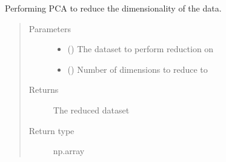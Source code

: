 \documentclass[letterpaper,10pt,english]{sphinxmanual}
\begin{document}

\begin{fulllineitems}
\label{\detokenize{index:Forecaster.preprocessing.dimension_reduce}}
Performing PCA to reduce the dimensionality of the data.
\begin{quote}\begin{description}
\item[{Parameters}] \leavevmode\begin{itemize}
\item {} 
 () \textendash{} The dataset to perform reduction on

\item {} 
 () \textendash{} Number of dimensions to reduce to

\end{itemize}

\item[{Returns}] \leavevmode
The reduced dataset

\item[{Return type}] \leavevmode
np.array

\end{description}\end{quote}

\end{fulllineitems}

\end{document}
